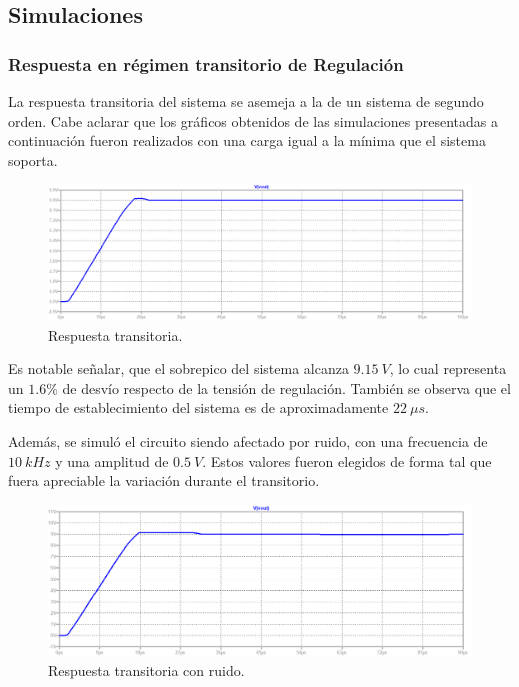 \subsection{Simulaciones}

\subsubsection{Respuesta en régimen transitorio de Regulación}
La respuesta transitoria del sistema se asemeja a la de un sistema de segundo orden. Cabe aclarar que los gráficos obtenidos de las simulaciones presentadas a continuación fueron realizados con una carga igual a la mínima que el sistema soporta.
\begin{figure}[H]
\centering
	\includegraphics[width=1\textwidth]{ImagenesEjercicio2/transresp.png}
	\caption{Respuesta transitoria.}
	\label{fig:transitorioFuente}
\end{figure}

Es notable señalar, que el sobrepico del sistema alcanza $9.15 \ V$, lo cual representa un $1.6\%$ de desvío respecto de la tensión de regulación. También se observa que el tiempo de establecimiento del sistema es de aproximadamente $22 \ \mu s$.

Además, se simuló el circuito siendo afectado por ruido, con una frecuencia de $10 \ kHz$ y una amplitud de $0.5 \ V$. Estos valores fueron elegidos de forma tal que fuera apreciable la variación  durante el transitorio.
\begin{figure}[H]
\centering
	\includegraphics[width=1\textwidth]{ImagenesEjercicio2/transrespnoise.png}
	\caption{Respuesta transitoria con ruido.}
	\label{fig:transitorioFuentenoise}
\end{figure}

